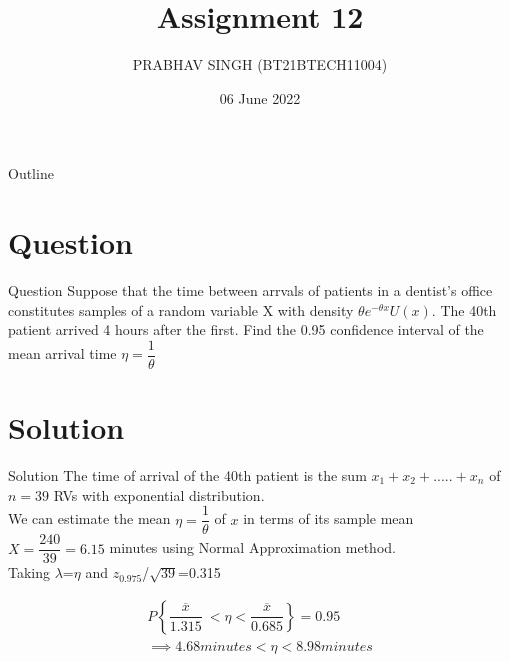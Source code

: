 \documentclass{beamer}
\title{Assignment 12}
\author{PRABHAV SINGH (BT21BTECH11004)}
\date{06 June 2022}
\begin{document}
	
	\begin{frame}
		\titlepage 
	\end{frame}
	
	\logo{}
	
	
	\begin{frame}{Outline}
		\tableofcontents
	\end{frame}
	
	\section{Question}
	\begin{frame}{Question}
	Suppose that the time between arrvals of patients in a dentist's office constitutes samples of 
	a random variable X with density $ {\theta}e^{-{\theta}x}U(x) $. The 40th patient arrived 4 hours after the first. 
	Find the 0.95 confidence interval of the mean arrival time $ {\eta}=\dfrac{1}{{\theta}} $
	
	\end{frame}
	
	
	\section{Solution}
	\begin{frame}{Solution}
	The time of arrival of the 40th patient is the sum $ x_{1} +x_{2} +..... + x_{n} $ of 
	$ n=39 $ RVs with exponential distribution.\\
	\medskip
	We can estimate the mean 
	$ {\eta}=\dfrac{1}{{\theta}} $ of $  x $ in terms of its sample mean $  X=\dfrac{240}{39}=6.15  $
	minutes using Normal Approximation method.  \\
	\medskip
	Taking {$\lambda$}={$\eta$} and $ z_{0.975} $/{$\sqrt{39}$}=0.315\\
	\end{frame}
\begin{frame}
	\begin{align}
		P\left\{\dfrac{\overline{x}}{1.315}\ < {\eta} < \dfrac{\overline{x}}{0.685}\right\}= 0.95 \\
		\implies 4.68minutes  < {\eta} < 8.98minutes
	\end{align}
\end{frame}
\end{document}
